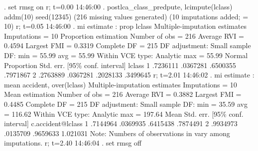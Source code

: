 . set rmsg on
r; t=0.00 14:46:00
{\smallskip}
. postlca_class_predpute, lcimpute(lclass) addm(10) seed(12345)
(216 missing values generated)
(10 imputations added; {} = 10)
r; t=0.05 14:46:00
{\smallskip}
. mi estimate : prop lclass
{\smallskip}
Multiple-imputation estimates     Imputations     =         10
Proportion estimation             Number of obs   =        216
                                  Average RVI     =     0.4594
                                  Largest FMI     =     0.3319
                                  Complete DF     =        215
DF adjustment:   Small sample     DF:     min     =      55.99
                                          avg     =      55.99
Within VCE type:     Analytic             max     =      55.99
{\smallskip}
             {\VBAR}                                   Normal
             {\VBAR} Proportion   Std. err.     [95\% conf. interval]
      lclass {\VBAR}
          1  {\VBAR}   .7236111   .0367281      .6500355    .7971867
          2  {\VBAR}   .2763889   .0367281      .2028133    .3499645
r; t=2.01 14:46:02
{\smallskip}
. mi estimate : mean accident, over(lclass)
{\smallskip}
Multiple-imputation estimates     Imputations     =         10
Mean estimation                   Number of obs   =        216
                                  Average RVI     =     0.3882
                                  Largest FMI     =     0.4485
                                  Complete DF     =        215
DF adjustment:   Small sample     DF:     min     =      35.59
                                          avg     =     116.62
Within VCE type:     Analytic             max     =     197.64
{\smallskip}
                  {\VBAR}       Mean   Std. err.     [95\% conf. interval]
c.accident@lclass {\VBAR}
               1  {\VBAR}   .7144964   .0369935      .6415438    .7874491
               2  {\VBAR}   .9934973   .0135709      .9659633    1.021031
Note: Numbers of observations in {} vary among imputations.
r; t=2.40 14:46:04
{\smallskip}
. set rmsg off
{\smallskip}
